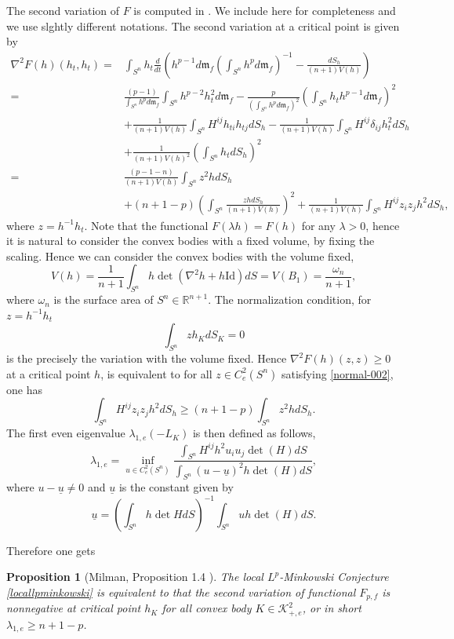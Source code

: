 \documentclass[reqno]{amsart}
\theoremstyle{remark}
\def\R{\mathbb{R}}
\def\cK{{\mathcal K}}
\theoremstyle{plain}
\newtheorem{prop}[thm]{Proposition}
\begin{document}
The second variation of $F$ is computed in \cite{Milman22}. We include here for completeness and we use slghtly different notations. 
The second variation at a critical point is given by \[
\begin{aligned}
    \nabla^2F(h)(h_t,h_t)
    =&\int_{S^n}h_t\frac{d}{dt}\left(h^{p-1}d\mathfrak{m}_f\left({\int_{S^n}h^pd\mathfrak{m}_f}\right)^{-1}-\frac{dS_h}{(n+1)V(h)}\right)\\
    =&\frac{(p-1)}{\int_{S^n}h^pd\mathfrak{m}_f}\int_{S^n}h^{p-2}h_t^2d\mathfrak{m}_f-\frac{p}{(\int_{S^n}h^pd\mathfrak{m}_f)^2}\left(\int_{S^n}h_th^{p-1}d\mathfrak{m}_f\right)^2\\
    &+\frac{1}{(n+1)V(h)}\int_{S^n}H^{ij}h_{ti}h_{tj}dS_h-\frac{1}{(n+1)V(h)}\int_{S^n}H^{ij}\delta_{ij}h_t^2dS_h\\
    &+\frac{1}{(n+1)V(h)^2}\left(\int
_{S^n}h_tdS_h\right)^2\\
=&\frac{(p-1-n)}{(n+1)V(h)}\int_{S^n}z^2hdS_h\\
&+(n+1-p)\left(\int
_{S^n}\frac{zhdS_h}{(n+1)V(h)}\right)^2+\frac{1}{(n+1)V(h)}\int_{S^n}H^{ij}z_{i}z_{j}h^2dS_h,
\end{aligned}
\]where $z=h^{-1}h_t$. 
Note that the functional $F(\lambda h)=F(h)$ for any $\lambda>0$, hence it is natural to consider the convex bodies with a fixed volume, by fixing the scaling. Hence we can consider the convex bodies with the volume fixed,
\[
V(h)=\frac{1}{n+1}\int_{S^n} h\det (\nabla^2 h+h \text{Id})dS=V(B_1)=\frac{\omega_n}{n+1},
\]
where $\omega_n$ is the surface area of $S^n\in \R^{n+1}$. The normalization condition, for $z=h^{-1} h_t$
\begin{equation}\label{normal-002}
    \int_{S^n} z h_KdS_K=0
\end{equation}
is the precisely the variation with the volume fixed.
Hence $\nabla^2F(h)(z,z)\geq 0$ at a critical point $h$, is equivalent to for all $z\in C^{2}_e(S^n)$ satisfying \eqref{normal-002}, one has \[
\int_{S^n}H^{ij}z_iz_jh^2dS_h\geq (n+1-p)\int_{S^n}z^2hdS_h.
\]
The first even eigenvalue $\lambda_{1, e}(-L_K)$ is then defined as follows,
\[
\lambda_{1, e}=\inf_{u\in C^2_e(S^n)} \frac{\displaystyle \int_{S^n}H^{ij}h^2u_iu_j\det(H)dS}{\displaystyle\int_{S^n}{(u-\underline u)^2} h\det(H)dS},
\]
where $u-\underline u \neq 0$ and $\underline u$ is the constant given by
\[
\underline u=\left(\int_{S^n}h\det{H}dS\right)^{-1}\int_{S^n} u h\det(H)dS.
\]

Therefore one gets \begin{prop}[Milman, Proposition 1.4 \cite{Milman22}]
    The local $L^p$-Minkowski Conjecture \ref{locallpminkowski} is equivalent to that the second variation of functional $F_{p,f}$ is nonnegative at critical point $h_K$ for all convex body $K\in \cK_{+,e}^2$, or in short $\lambda_{1, e}\geq n+1-p$.
\end{prop}
\end{document}
